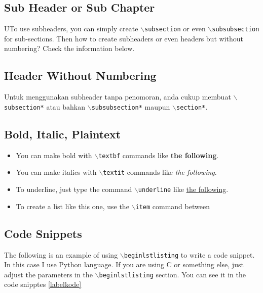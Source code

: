 \documentclass[11pt,a4paper]{article}
\begin{document}
\subsection{Sub Header or Sub Chapter}
     UTo use subheaders, you can simply create $\backslash${\tt{subsection}} or even $\backslash${\tt{subsubsection}} for sub-sections. Then how to create subheaders or even headers but without numbering? Check the information below.

\subsection*{Header Without Numbering}
     Untuk menggunakan subheader tanpa penomoran, anda cukup membuat $\backslash${\tt{subsection*}} atau bahkan  $\backslash${\tt{subsubsection*}} maupun $\backslash${\tt{section*}}.
    
\subsection{Bold, Italic, Plaintext}
\begin{itemize}
    \item You can make bold with $\backslash${\tt{textbf}} commands like \textbf{the following}.
    \item You can make italics with $\backslash${\tt{textit}} commands like \textit{the following}. \item To underline, just type the command $\backslash${\tt{underline}} like \underline{the following}.
    \item To create a list like this one, use the $\backslash${\tt{item}} command between
\end{itemize}

\subsection{Code Snippets}
    The following is an example of using $\backslash${\tt{begin{lstlisting}}} to write a code snippet. In this case I use Python language. If you are using C or something else, just adjust the parameters in the $\backslash${\tt{begin{lstlisting}}} section. You can see it in the code snipptes \ref{labelkode}
    
\end{document}
